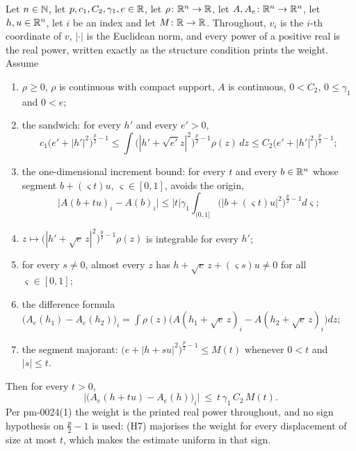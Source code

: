 \begin{helper}
Let $n\in\mathbb{N}$, let $p,c_1,C_2,\gamma_1,e\in\mathbb{R}$, let $\rho\colon\mathbb{R}^n\to\mathbb{R}$, let
$A,A_e\colon\mathbb{R}^n\to\mathbb{R}^n$, let $h,u\in\mathbb{R}^n$, let $i$ be an index and let
$M\colon\mathbb{R}\to\mathbb{R}$.  Throughout, $v_i$ is the $i$-th coordinate of $v$,
$|\cdot|$ is the Euclidean norm, and every power of a positive real is the real
power, written exactly as the structure condition prints the weight.  Assume
\begin{enumerate}
\item[(H1)] $\rho\ge0$, $\rho$ is continuous with compact support, $A$ is
  continuous, $0<C_2$, $0\le\gamma_1$ and $0<e$;
\item[(H2)] the sandwich: for every $h'$ and every $e'>0$,
  \[
  c_1\bigl(e'+|h'|^2\bigr)^{\frac p2-1}
   \le\int\bigl(|h'+\sqrt{e'}z|^2\bigr)^{\frac p2-1}\rho(z)\,dz
   \le C_2\bigl(e'+|h'|^2\bigr)^{\frac p2-1};
  \]
\item[(H3)] the one-dimensional increment bound: for every $t$ and every
  $b\in\mathbb{R}^n$ whose segment $b+(\varsigma t)u$, $\varsigma\in[0,1]$, avoids the
  origin,
  \[
  \bigl|A(b+tu)_i-A(b)_i\bigr|
   \le|t|\gamma_1\int_{(0,1]}\bigl(|b+(\varsigma t)u|^2\bigr)^{\frac p2-1}d\varsigma;
  \]
\item[(H4)] $z\mapsto\bigl(|h'+\sqrt e\,z|^2\bigr)^{\frac p2-1}\rho(z)$ is
  integrable for every $h'$;
\item[(H5)] for every $s\neq0$, almost every $z$ has
  $h+\sqrt e\,z+(\varsigma s)u\neq0$ for all $\varsigma\in[0,1]$;
\item[(H6)] the difference formula
  $\bigl(A_e(h_1)-A_e(h_2)\bigr)_i
    =\int\rho(z)\bigl(A(h_1+\sqrt e\,z)_i-A(h_2+\sqrt e\,z)_i\bigr)dz$;
\item[(H7)] the segment majorant: $\bigl(e+|h+su|^2\bigr)^{\frac p2-1}\le M(t)$
  whenever $0<t$ and $|s|\le t$.
\end{enumerate}
Then for every $t>0$,
\[
\bigl|\bigl(A_e(h+tu)-A_e(h)\bigr)_i\bigr|\ \le\ t\,\gamma_1\,C_2\,M(t).
\]
Per pm-0024(1) the weight is the printed real power throughout, and no sign
hypothesis on $\frac p2-1$ is used: (H7) majorises the weight for every
displacement of size at most $t$, which makes the estimate uniform in that
sign.
\end{helper}
